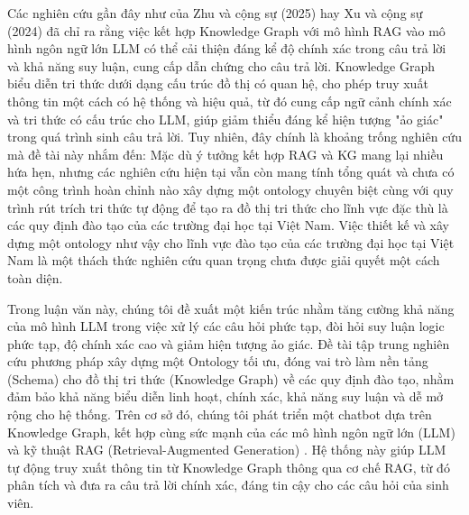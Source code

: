 \documentclass[a4paper,12pt]{article}
\begin{document}
Các nghiên cứu gần đây như của Zhu và cộng sự (2025) \cite{Knowledge_Graph} hay Xu và cộng sự (2024) \cite{Knowledge_Graph_Customer_Service} đã chỉ ra rằng việc kết hợp Knowledge Graph với mô hình RAG \cite{RAG} vào mô hình ngôn ngữ lớn LLM có thể cải thiện đáng kể độ chính xác trong câu trả lời và khả năng suy luận, cung cấp dẫn chứng cho câu trả lời.
Knowledge Graph biểu diễn tri thức dưới dạng cấu trúc đồ thị có quan hệ, cho phép truy xuất thông tin một cách có hệ thống và hiệu quả, từ đó cung cấp ngữ cảnh chính xác và tri thức có cấu trúc cho LLM, giúp giảm thiểu đáng kể hiện tượng "ảo giác" trong quá trình sinh câu trả lời.
Tuy nhiên, đây chính là khoảng trống nghiên cứu mà đề tài này nhắm đến: Mặc dù ý tưởng kết hợp RAG và KG mang lại nhiều hứa hẹn, nhưng các nghiên cứu hiện tại vẫn còn mang tính tổng quát và chưa có một công trình hoàn chỉnh nào xây dựng một ontology chuyên biệt cùng với quy trình rút trích tri thức tự động để tạo ra đồ thị tri thức cho lĩnh vực đặc thù là các quy định đào tạo của các trường đại học tại Việt Nam.
Việc thiết kế và xây dựng một ontology như vậy cho lĩnh vực đào tạo của các trường đại học tại Việt Nam là một thách thức nghiên cứu quan trọng chưa được giải quyết một cách toàn diện.

Trong luận văn này, chúng tôi đề xuất một kiến trúc nhằm tăng cường khả năng của mô hình LLM trong việc xử lý các câu hỏi phức tạp, đòi hỏi suy luận logic phức tạp, độ chính xác cao và giảm hiện tượng ảo giác.
Đề tài tập trung nghiên cứu phương pháp xây dựng một Ontology \cite{Legal_Ontology} tối ưu, đóng vai trò làm nền tảng (Schema) cho đồ thị tri thức (Knowledge Graph) về các quy định đào tạo, nhằm đảm bảo khả năng biểu diễn linh hoạt, chính xác, khả năng suy luận và dễ mở rộng cho hệ thống.
Trên cơ sở đó, chúng tôi phát triển một chatbot dựa trên Knowledge Graph, kết hợp cùng sức mạnh của các mô hình ngôn ngữ lớn (LLM) và kỹ thuật RAG (Retrieval-Augmented Generation) \cite{RAG}. 
Hệ thống này giúp LLM tự động truy xuất thông tin từ Knowledge Graph thông qua cơ chế RAG, từ đó phân tích và đưa ra câu trả lời chính xác, đáng tin cậy cho các câu hỏi của sinh viên.
\end{document}
